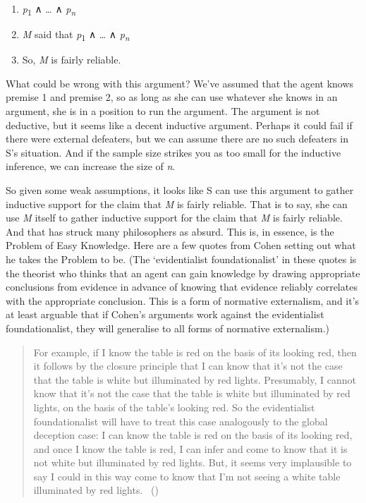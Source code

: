 \documentclass[
  10pt,
  letterpaper,
  twoside]{scrbook}
\providecommand{\tightlist}{%
  \setlength{\itemsep}{0pt}\setlength{\parskip}{0pt}}\usepackage{longtable,booktabs,array}
\begin{document}
\begin{enumerate}
\def\labelenumi{\arabic{enumi}.}
\tightlist
\item
  \emph{p}\textsubscript{1} ∧ \ldots{} ∧ \emph{p\textsubscript{n}}
\item
  \emph{M} said that \emph{p}\textsubscript{1} ∧ \ldots{} ∧
  \emph{p\textsubscript{n}}
\item
  So, \emph{M} is fairly reliable.
\end{enumerate}

What could be wrong with this argument? We've assumed that the agent
knows premise 1 and premise 2, so as long as she can use whatever she
knows in an argument, she is in a position to run the argument. The
argument is not deductive, but it seems like a decent inductive
argument. Perhaps it could fail if there were external defeaters, but we
can assume there are no such defeaters in S's situation. And if the
sample size strikes you as too small for the inductive inference, we can
increase the size of \emph{n}.

So given some weak assumptions, it looks like S can use this argument to
gather inductive support for the claim that \emph{M} is fairly reliable.
That is to say, she can use \emph{M} itself to gather inductive support
for the claim that \emph{M} is fairly reliable. And that has struck many
philosophers as absurd. This is, in essence, is the Problem of Easy
Knowledge. Here are a few quotes from Cohen setting out what he takes
the Problem to be. (The `evidentialist foundationalist' in these quotes
is the theorist who thinks that an agent can gain knowledge by drawing
appropriate conclusions from evidence in advance of knowing that
evidence reliably correlates with the appropriate conclusion. This is a
form of normative externalism, and it's at least arguable that if
Cohen's arguments work against the evidentialist foundationalist, they
will generalise to all forms of normative externalism.)

\begin{quote}
For example, if I know the table is red on the basis of its looking red,
then it follows by the closure principle that I can know that it's not
the case that the table is white but illuminated by red lights.
Presumably, I cannot know that it's not the case that the table is white
but illuminated by red lights, on the basis of the table's looking red.
So the evidentialist foundationalist will have to treat this case
analogously to the global deception case: I can know the table is red on
the basis of its looking red, and once I know the table is red, I can
infer and come to know that it is not white but illuminated by red
lights. But, it seems very implausible to say I could in this way come
to know that I'm not seeing a white table illuminated by red lights.
~()
\end{quote}
\end{document}
